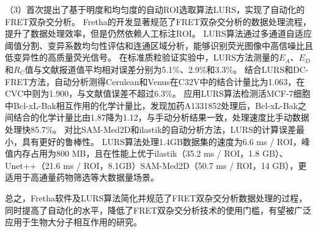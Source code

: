 \begin{cabstract}
（3）首次提出了基于明度和均匀度的自动ROI选取算法LURS，实现了自动化的FRET双杂交分析。
Fretha的开发显著规范了FRET双杂交分析的数据处理流程，提升了数据处理效率，但是仍然依赖人工标注ROI。
LURS算法通过多通道自适应阈值分割、变异系数均匀性评估和连通区域分析，能够识别荧光图像中高信噪比且低变异性的高质量荧光信号。
在标准质粒验证实验中，LURS方法测量的$E_{A}$、$E_{D}$和$R_C$值与文献报道值平均相对误差分别为5.1\%、2.9\%和3.3\%。
结合LURS和DC-FRET方法，自动分析测得Cerulean和Venus在C32V中的结合计量比为1.063，在CVC中则为1.900，与文献值误差不超过6.3\%。
应用LURS算法检测活MCF-7细胞中Bcl-xL-Bak相互作用的化学计量比，发现加药A1331852处理后，Bcl-xL-Bak之间结合的化学计量比由1.87降为1.12，与手动分析结果一致，处理速度比手动数据处理快85.7\%。
对比SAM-Med2D和ilastik的自动分析方法，LURS的计算误差最小，具有更好的鲁棒性。
LURS算法处理1.4GB数据集的速度为6.6 ms / ROI，峰值内存占用为800 MB，且在性能上优于ilastik（35.2 ms / ROI，1.8 GB）、Unet++（21.6 ms / ROI，8.1GB）SAM-Med2D（50.7 ms / ROI，14 GB），更适用于高通量药物筛选等大数据量场景。

总之，Fretha软件及LURS算法简化并规范了FRET双杂交分析数据处理的过程，同时提高了自动化的水平，降低了FRET双杂交分析技术的使用门槛，有望被广泛应用于生物大分子相互作用的研究。
\end{cabstract}
\vspace{3pt}
